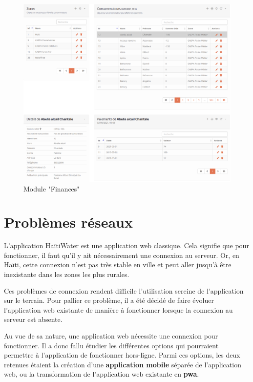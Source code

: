 \documentclass{EPL-master-thesis-covers-FR}
\begin{document}
				\begin{figure}[H]
					\centering
					\includegraphics[width=1\textwidth]{images/finances}
					\caption{Module "Finances"}
				\end{figure}
				
				
		\section{Problèmes réseaux}
			L'application HaïtiWater est une application web classique. Cela signifie que pour fonctionner, il faut qu'il y ait nécessairement une connexion au serveur. Or, en Haïti, cette connexion n'est pas très stable en ville et peut aller jusqu'à être inexistante dans les zones les plus rurales. 
			
			Ces problèmes de connexion rendent difficile l'utilisation sereine de l'application sur le terrain. Pour pallier ce problème, il a été décidé de faire évoluer l'application web existante de manière à fonctionner lorsque la connexion au serveur est absente.
				
			Au vue de sa nature, une application web nécessite une connexion pour fonctionner. Il a donc fallu étudier les différentes options qui pourraient permettre à l'application de fonctionner hors-ligne. Parmi ces options,  les deux retenues étaient la création d'une \textbf{application mobile} séparée de l'application web, ou la transformation de l'application web existante en \textbf{\gls{pwa}}. 
				
\end{document}

